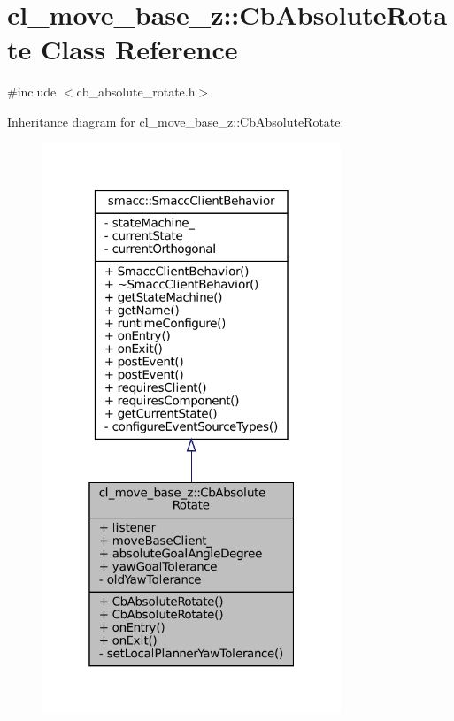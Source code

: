\hypertarget{classcl__move__base__z_1_1CbAbsoluteRotate}{}\section{cl\+\_\+move\+\_\+base\+\_\+z\+:\+:Cb\+Absolute\+Rotate Class Reference}
\label{classcl__move__base__z_1_1CbAbsoluteRotate}


{\ttfamily \#include $<$cb\+\_\+absolute\+\_\+rotate.\+h$>$}



Inheritance diagram for cl\+\_\+move\+\_\+base\+\_\+z\+:\+:Cb\+Absolute\+Rotate\+:
\nopagebreak
\begin{figure}[H]
\begin{center}
\leavevmode
\includegraphics[width=253pt]{classcl__move__base__z_1_1CbAbsoluteRotate__inherit__graph}
\end{center}
\end{figure}


